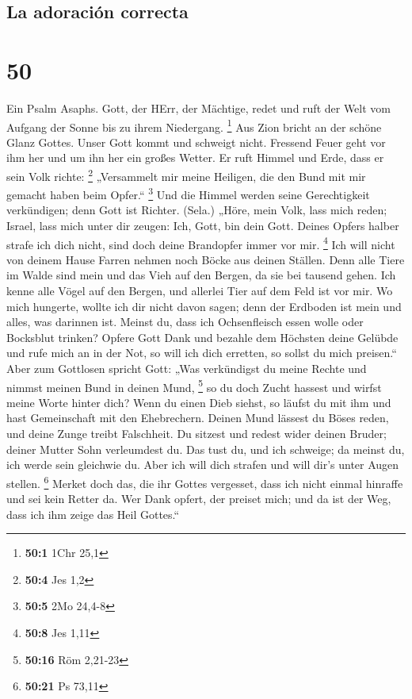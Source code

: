 \hypertarget{la-adoraciuxf3n-correcta}{%
\subsection{La adoración correcta}\label{la-adoraciuxf3n-correcta}}

\hypertarget{section-49}{%
\section{50}\label{section-49}}

 Ein Psalm Asaphs. Gott, der HErr, der Mächtige, redet und
ruft der Welt vom Aufgang der Sonne bis zu ihrem Niedergang. \footnote{\textbf{50:1}
  1Chr 25,1}  Aus Zion bricht an der schöne Glanz Gottes.
 Unser Gott kommt und schweigt nicht. Fressend Feuer geht
vor ihm her und um ihn her ein großes Wetter.  Er ruft
Himmel und Erde, dass er sein Volk richte: \footnote{\textbf{50:4} Jes
  1,2}  „Versammelt mir meine Heiligen, die den Bund mit
mir gemacht haben beim Opfer.`` \footnote{\textbf{50:5} 2Mo 24,4-8}
 Und die Himmel werden seine Gerechtigkeit verkündigen;
denn Gott ist Richter. (Sela.)  „Höre, mein Volk, lass
mich reden; Israel, lass mich unter dir zeugen: Ich, Gott, bin dein
Gott.  Deines Opfers halber strafe ich dich nicht, sind
doch deine Brandopfer immer vor mir. \footnote{\textbf{50:8} Jes 1,11}
 Ich will nicht von deinem Hause Farren nehmen noch Böcke
aus deinen Ställen.  Denn alle Tiere im Walde sind mein
und das Vieh auf den Bergen, da sie bei tausend gehen. 
Ich kenne alle Vögel auf den Bergen, und allerlei Tier auf dem Feld ist
vor mir.  Wo mich hungerte, wollte ich dir nicht davon
sagen; denn der Erdboden ist mein und alles, was darinnen ist.
 Meinst du, dass ich Ochsenfleisch essen wolle oder
Bocksblut trinken?  Opfere Gott Dank und bezahle dem
Höchsten deine Gelübde  und rufe mich an in der Not, so
will ich dich erretten, so sollst du mich preisen.`` 
Aber zum Gottlosen spricht Gott: „Was verkündigst du meine Rechte und
nimmst meinen Bund in deinen Mund, \footnote{\textbf{50:16} Röm 2,21-23}
 so du doch Zucht hassest und wirfst meine Worte hinter
dich?  Wenn du einen Dieb siehst, so läufst du mit ihm
und hast Gemeinschaft mit den Ehebrechern.  Deinen Mund
lässest du Böses reden, und deine Zunge treibt Falschheit.
 Du sitzest und redest wider deinen Bruder; deiner Mutter
Sohn verleumdest du.  Das tust du, und ich schweige; da
meinst du, ich werde sein gleichwie du. Aber ich will dich strafen und
will dir's unter Augen stellen. \footnote{\textbf{50:21} Ps 73,11}
 Merket doch das, die ihr Gottes vergesset, dass ich
nicht einmal hinraffe und sei kein Retter da.  Wer Dank
opfert, der preiset mich; und da ist der Weg, dass ich ihm zeige das
Heil Gottes.``

